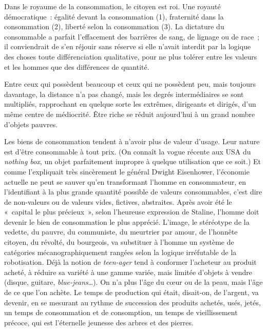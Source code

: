 \documentclass[french,twoside]{book} %
\begin{document}
\noindent Dans le royaume de la consommation, le citoyen est roi. Une royauté démocratique : égalité devant la consommation (1), fraternité dans la consommation (2), liberté selon la consommation (3). La dictature du consommable a parfait l’effacement des barrières de sang, de lignage ou de race ; il conviendrait de s’en réjouir sans réserve si elle n’avait interdit par la logique des choses toute différenciation qualitative, pour ne plus tolérer entre les valeurs et les hommes que des différences de quantité.\par
Entre ceux qui possèdent beaucoup et ceux qui ne possèdent peu, mais toujours davantage, la distance n’a pas changé, mais les degrés intermédiaires se sont multipliés, rapprochant en quelque sorte les extrêmes, dirigeants et dirigés, d’un même centre de médiocrité. Être riche se réduit aujourd’hui à un grand nombre d’objets pauvres.\par
Les biens de consommation tendent à n’avoir plus de valeur d’usage. Leur nature est d’être consommable à tout prix. (On connaît la vogue récente aux USA du \emph{nothing box}, un objet parfaitement impropre à quelque utilisation que ce soit.) Et comme l’expliquait très sincèrement le général Dwight Eisenhower, l’économie actuelle ne peut se sauver qu’en transformant l’homme en consommateur, en l’identifiant à la plus grande quantité possible de valeurs consommables, c’est dire de non-valeurs ou de valeurs vides, fictives, abstraites. Après avoir été le « capital le plus précieux », selon l’heureuse expression de Staline, l’homme doit devenir le bien de consommation le plus apprécié. L’image, le stéréotype de la vedette, du pauvre, du communiste, du meurtrier par amour, de l’honnête citoyen, du révolté, du bourgeois, va substituer à l’homme un système de catégories mécanographiquement rangées selon la logique irréfutable de la robotisation. Déjà la notion de \emph{teen-ager} tend à conformer l’acheteur au produit acheté, à réduire sa variété à une gamme variée, mais limitée d’objets à vendre (disque, guitare, \emph{blue-jeans}…). On n’a plus l’âge du cœur ou de la peau, mais l’âge de ce que l’on achète. Le temps de production qui était, disait-on, de l’argent, va devenir, en se mesurant au rythme de succession des produits achetés, usés, jetés, un temps de consommation et de consomption, un temps de vieillissement précoce, qui est l’éternelle jeunesse des arbres et des pierres.\par
\end{document}

